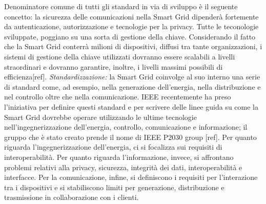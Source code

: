 Denominatore comune di tutti gli standard in via di sviluppo è il seguente concetto: la sicurezza delle comunicazioni nella Smart Grid dipenderà fortemente da autenticazione, autorizzazione e tecnologie per la privacy. \newline Tutte le teconologie sviluppate, poggiano su una sorta di gestione della chiave. Considerando il fatto che la Smart Grid conterrà milioni di dispositivi, diffusi tra tante organizzazioni, i sistemi di gestione della chiave utilizzati dovranno essere scalabili a livelli straordinari e dovranno garantire, inoltre, i livelli massimi possibili di efficienza[ref].
\newline \newline
\textit{Standardizzazione:} la Smart Grid coinvolge al suo interno una serie di standard come, ad esempio, nella generazione dell'energia, nella distribuzione e nel controllo oltre che nella comunicazione. IEEE recentemente ha preso l'iniziativa per definire questi standard e per scrivere delle linee guida su come la Smart Grid dovrebbe operare utilizzando le ultime tecnologie nell'ingegnerizzazione dell'energia, controllo, comunicazione e informazione; il gruppo che è stato creato prende il nome di IEEE P2030 group [ref]. \newline Per quanto riguarda l'ingegnerizzazione dell'energia, ci si focalizza sui requisiti di interoperabilità. Per quanto riguarda l'informazione, invece, si affrontano problemi relativi alla privacy, sicurezza, integrità dei dati, interoperabilità e interfacce. Per la comunicazione, infine, si definiscono i requisiti per l'interazione tra i dispositivi e si stabiliscono limiti per generazione, distribuzione e trasmissione in collaborazione con i clienti.
 
\newpage
